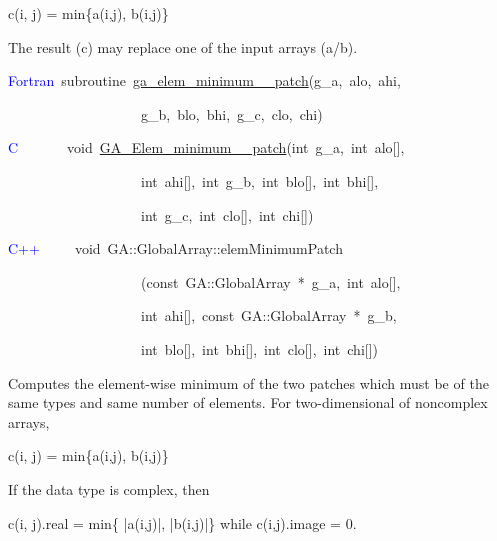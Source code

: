 c(i, j) = min\{a(i,j), b(i,j)\}

The result (c) may replace one of the input arrays (a/b). 
\begin{lyxcode}
\textcolor{blue}{Fortran}~subroutine~\href{http://www.emsl.pnl.gov/docs/global/ga_ops.html\#ga_elem_minimum_patch}{ga\_{}elem\_{}minimum\_{}\_{}patch}(g\_a,~alo,~ahi,

~~~~~~~~~~~~~~~~~~~g\_b,~blo,~bhi,~g\_c,~clo,~chi)~

\textcolor{blue}{C}~~~~~~~void~\href{http://www.emsl.pnl.gov/docs/global/c_nga_ops.html\#ga_elem_minimum_patch}{GA\_{}Elem\_{}minimum\_{}\_{}patch}(int~g\_a,~int~alo{[}{]},~

~~~~~~~~~~~~~~~~~~~int~ahi{[}{]},~int~g\_b,~int~blo{[}{]},~int~bhi{[}{]},~

~~~~~~~~~~~~~~~~~~~int~g\_c,~int~clo{[}{]},~int~chi{[}{]})

\textcolor{blue}{C++}~~~~~void~GA::GlobalArray::elemMinimumPatch~~

~~~~~~~~~~~~~~~~~~~(const~GA::GlobalArray~{*}~g\_a,~int~alo{[}{]},~

~~~~~~~~~~~~~~~~~~~int~ahi{[}{]},~const~GA::GlobalArray~{*}~g\_b,~

~~~~~~~~~~~~~~~~~~~int~blo{[}{]},~int~bhi{[}{]},~int~clo{[}{]},~int~chi{[}{]})
\end{lyxcode}
Computes the element-wise minimum of the two patches which must be
of the same types and same number of elements. For two-dimensional
of noncomplex arrays,

c(i, j) = min\{a(i,j), b(i,j)\}

If the data type is complex, then

c(i, j).real = min\{ |a(i,j)|, |b(i,j)|\} while c(i,j).image = 0.


